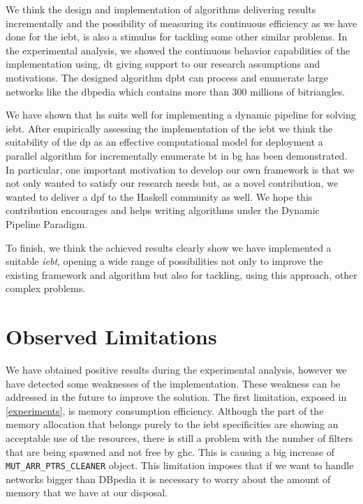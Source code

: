 We think the design and implementation of algorithms delivering results incrementally and the possibility of measuring its continuous efficiency as we have done for the \acrshort{iebt}, is also a  stimulus for tackling some other similar problems. In the experimental analysis, we showed the continuous behavior capabilities of the implementation using, \acrlong{dt} giving support to our research assumptions and motivations. The designed algorithm \acrshort{dpbt} can process and enumerate large networks like the \acrlong{dbpedia} which contains more than $300$ millions of bitriangles. 

We have shown that \acrlong{hs} suits well for implementing a dynamic pipeline for solving \acrlong{iebt}. After empirically assessing the implementation of the \acrshort{iebt} we think the suitability of the  \acrlong{dp} as an effective  computational model for deployment a parallel algorithm  for incrementally enumerate \acrlong{bt} in \acrlong{bg} has been  demonstrated. 
In particular, one important motivation to develop our own framework is that we not only wanted to satisfy our research needs but, as a novel contribution, we wanted to deliver a \acrshort{dpf} to the Haskell community as well. We hope this contribution encourages and helps writing algorithms under the Dynamic Pipeline Paradigm.

To finish, we think the achieved results clearly show we have implemented a suitable \emph{\acrlong{iebt}}, opening a wide range of possibilities not only to improve the existing framework and algorithm but also for tackling, using this approach, other complex problems.

\section{Observed Limitations}
We have  obtained positive results during the experimental analysis, however we have detected some weaknesses of the implementation.  These weakness can be addressed in the future to improve  the solution. 
The first  limitation, exposed in  \autoref{experiments}, is memory consumption  efficiency. Although the part of the memory allocation that belongs purely to the \acrshort{iebt} specificities are showing an acceptable use of the resources, there is still a problem with the number of filters that are being spawned and not free by \acrshort{ghc}.
This is causing a big increase of \texttt{MUT\_ARR\_PTRS\_CLEANER} object. This  limitation  imposes that if we want to handle networks bigger than DBpedia it is necessary to worry about the amount of memory that we have at our disposal. 

